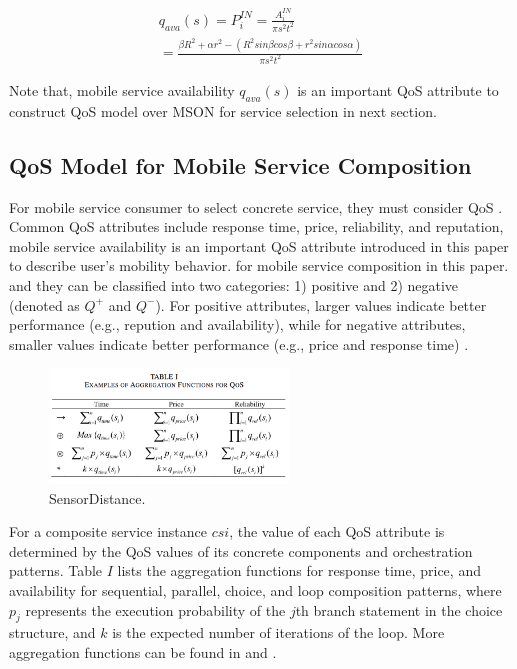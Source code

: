 \documentclass[10pt,journal,compsoc]{IEEEtran}
\begin{document}
\begin{eqnarray}
q_{ava}(s) = P^{IN}_i = \frac{A_i^{IN}}{\pi s^2 t^2}\\\nonumber
= \frac{\beta R^2 + \alpha r^2 - (R^2 sin\beta cos\beta + r^2 sin\alpha cos\alpha)}{\pi s^2 t^2}
\end{eqnarray}

Note that, mobile service availability $q_{ava}(s)$ is an important QoS attribute to construct QoS model over MSON for service selection in next section.


\subsection{QoS Model for Mobile Service Composition}

For mobile service consumer to select concrete service, they must consider QoS \cite{wu2013predicting,luo2014efficient,luo2016generating}. Common QoS attributes include response time, price, reliability, and reputation, mobile service availability is an important QoS attribute introduced in this paper to describe user's mobility behavior. for mobile service composition in this paper. and they can be classified into two categories: 1) positive and 2) negative (denoted as $Q^+$ and $Q^−$). For positive attributes, larger values indicate better performance (e.g., repution and availability), while for negative attributes, smaller values indicate better performance (e.g., price and response time) \cite{Wu2016}.	

\begin{figure}[!t]
\centering
\includegraphics[width=2.5in]{./img/fig4.png}
\caption{SensorDistance.}
\label{fig_sim}
\end{figure}

For a composite service instance $csi$, the value of each QoS attribute is determined by the QoS values of its concrete components and orchestration patterns. Table $I$ lists the aggregation functions for response time, price, and availability for sequential, parallel, choice, and loop composition patterns, where $p_j$ represents the execution probability of the $j$th branch statement in the choice structure, and $k$ is the expected number of iterations of the loop. More aggregation functions can be found in \cite{jaeger2004qos} and \cite{zheng2013qos}.
\end{document}
